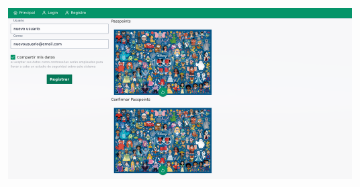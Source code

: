 \begin{anexos}
\begin{figure}
	\begin{figure}[H]
		\centering
		\begin{minipage}[b]{0.68\linewidth}  %
			\centering
			\includegraphics[width=\linewidth]{Graphics/capturas/full-screen disney-password.png}
			

\end{minipage}
\end{figure}
\end{figure}
\end{anexos}

